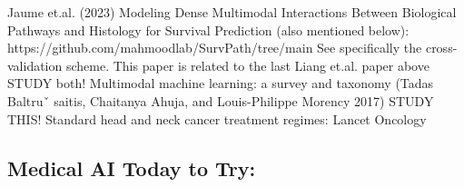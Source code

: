 \documentclass{article}%
\begin{document}
\newline%
\newline%
%
%
\newline%
\newline%
%
Jaume et.al. (2023) Modeling Dense Multimodal Interactions Between Biological Pathways and Histology for Survival Prediction (also mentioned below): https://github.com/mahmoodlab/SurvPath/tree/main %
\newline%
\newline%
%
See specifically the cross{-}validation scheme. %
\newline%
\newline%
%
This paper is related to the last Liang et.al. paper above %
\newline%
\newline%
%
STUDY both! %
\newline%
\newline%
%
Multimodal machine learning: a survey and taxonomy (Tadas Baltruˇ saitis, Chaitanya Ahuja, and Louis{-}Philippe Morency 2017) STUDY THIS! %
\newline%
\newline%
%
%
\newline%
\newline%
%
Standard head and neck cancer treatment regimes: %
\newline%
\newline%
%
Lancet Oncology %
\newline%
\newline%
%
\subsection{Medical AI Today to Try: }%
\label{subsec:MedicalAITodaytoTry}%
\end{document}
